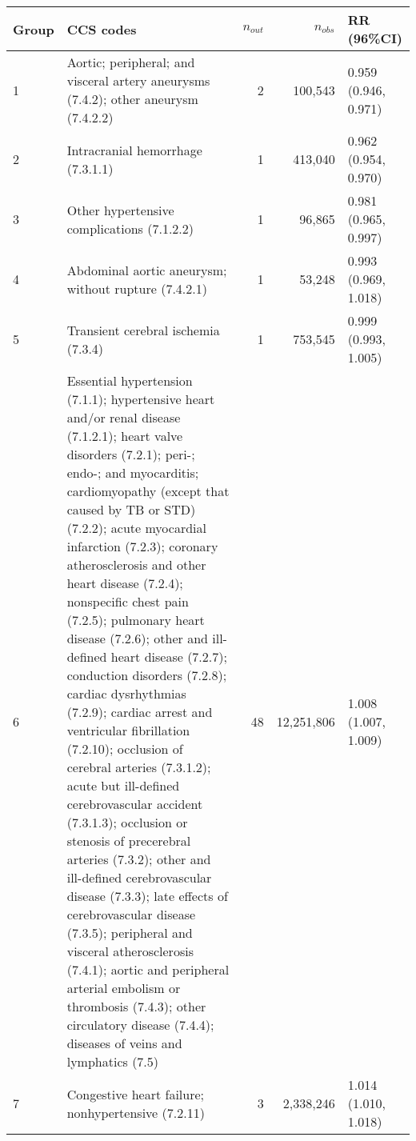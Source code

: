 \begin{tabular}{lp{6.5cm}rrp{2.2cm}}
  \hline
Group & CCS codes & $n_{out}$ & $n_{obs}$ & RR (96\%CI) \\ 
  \hline
   1 & Aortic; peripheral; and visceral artery aneurysms (7.4.2); other aneurysm (7.4.2.2) &    2 & 100,543 & 0.959 (0.946, 0.971) \\ 
     2 & Intracranial hemorrhage (7.3.1.1) &    1 & 413,040 & 0.962 (0.954, 0.970) \\ 
     3 & Other hypertensive complications (7.1.2.2) &    1 & 96,865 & 0.981 (0.965, 0.997) \\ 
     4 & Abdominal aortic aneurysm; without rupture (7.4.2.1) &    1 & 53,248 & 0.993 (0.969, 1.018) \\ 
     5 & Transient cerebral ischemia (7.3.4) &    1 & 753,545 & 0.999 (0.993, 1.005) \\ 
     6 & Essential hypertension (7.1.1); hypertensive heart and/or renal disease (7.1.2.1); heart valve disorders (7.2.1); peri-; endo-; and myocarditis; cardiomyopathy (except that caused by TB or STD) (7.2.2); acute myocardial infarction (7.2.3); coronary atherosclerosis and other heart disease (7.2.4); nonspecific chest pain (7.2.5); pulmonary heart disease (7.2.6); other and ill-defined heart disease (7.2.7); conduction disorders (7.2.8); cardiac dysrhythmias (7.2.9); cardiac arrest and ventricular fibrillation (7.2.10); occlusion of cerebral arteries (7.3.1.2); acute but ill-defined cerebrovascular accident (7.3.1.3); occlusion or stenosis of precerebral arteries (7.3.2); other and ill-defined cerebrovascular disease (7.3.3); late effects of cerebrovascular disease (7.3.5); peripheral and visceral atherosclerosis (7.4.1); aortic and peripheral arterial embolism or thrombosis (7.4.3); other circulatory disease (7.4.4); diseases of veins and lymphatics (7.5) &   48 & 12,251,806 & 1.008 (1.007, 1.009) \\ 
     7 & Congestive heart failure; nonhypertensive (7.2.11) &    3 & 2,338,246 & 1.014 (1.010, 1.018) \\ 
   \hline
\end{tabular}

